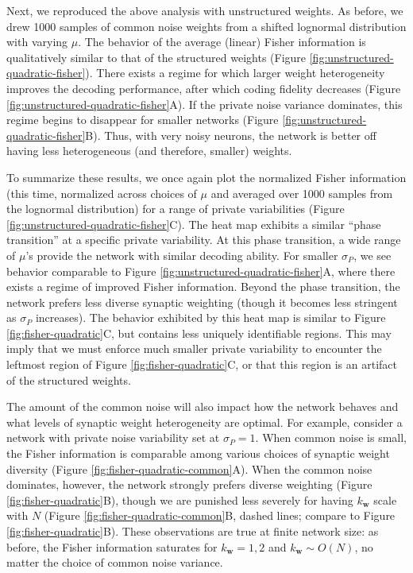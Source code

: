 \documentclass[12pt]{article}
\begin{document}
Next, we reproduced the above analysis with unstructured weights. As before, we drew 1000 samples of common noise weights from a shifted lognormal distribution with varying $\mu$. The behavior of the average (linear) Fisher information is qualitatively similar to that of the structured weights (Figure \ref{fig:unstructured-quadratic-fisher}). There exists a regime for which larger weight heterogeneity improves the decoding performance, after which coding fidelity decreases (Figure \ref{fig:unstructured-quadratic-fisher}A). If the private noise variance dominates, this regime begins to disappear for smaller networks (Figure \ref{fig:unstructured-quadratic-fisher}B). Thus, with very noisy neurons, the network is better off having less heterogeneous (and therefore, smaller) weights.
	
To summarize these results, we once again plot the normalized Fisher information (this time, normalized across choices of $\mu$ and averaged over 1000 samples from the lognormal distribution) for a range of private variabilities (Figure \ref{fig:unstructured-quadratic-fisher}C).  The heat map exhibits a similar ``phase transition'' at a specific private variability. At this phase transition, a wide range of $\mu$'s provide the network with similar decoding ability. For smaller $\sigma_P$, we see behavior comparable to Figure \ref{fig:unstructured-quadratic-fisher}A, where there exists a regime of improved Fisher information. Beyond the phase transition, the network prefers less diverse synaptic weighting (though it becomes less stringent as $\sigma_P$ increases). The behavior exhibited by this heat map is similar to Figure \ref{fig:fisher-quadratic}C, but contains less uniquely identifiable regions. This may imply that we must enforce much smaller private variability to encounter the leftmost region of Figure \ref{fig:fisher-quadratic}C, or that this region is an artifact of the structured weights.

The amount of the common noise will also impact how the network behaves and what levels of synaptic weight heterogeneity are optimal. For example, consider a network with private noise variability set at $\sigma_P=1$. When common noise is small, the Fisher information is comparable among various choices of synaptic weight diversity (Figure \ref{fig:fisher-quadratic-common}A). When the common noise dominates, however, the network strongly prefers diverse weighting (Figure \ref{fig:fisher-quadratic}B), though we are punished less severely for having $k_{\mathbf{w}}$ scale with $N$ (Figure \ref{fig:fisher-quadratic-common}B, dashed lines; compare to Figure \ref{fig:fisher-quadratic}B). These observations are true at finite network size: as before, the Fisher information saturates for $k_{\mathbf{w}}=1,2$ and $k_{\mathbf{w}} \sim O(N)$, no matter the choice of common noise variance. 
\end{document}

